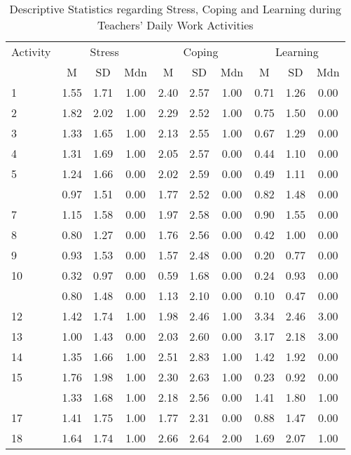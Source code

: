 \documentclass[
]{article}
\begin{document}
\begingroup\fontsize{9}{11}\selectfont

\begin{longtable}[t]{lccccccccc}
\caption{\label{tab:rq1 kable table}Descriptive Statistics regarding Stress, Coping and Learning during Teachers' Daily Work Activities}\\
\toprule
\multicolumn{1}{c}{Activity} & \multicolumn{3}{c}{Stress} & \multicolumn{3}{c}{Coping} & \multicolumn{3}{c}{Learning} \\
\cmidrule(l{3pt}r{3pt}){1-1} \cmidrule(l{3pt}r{3pt}){2-4} \cmidrule(l{3pt}r{3pt}){5-7} \cmidrule(l{3pt}r{3pt}){8-10}
 & M & SD & Mdn & M & SD & Mdn & M & SD & Mdn\\
\midrule
1 & 1.55 & 1.71 & 1.00 & 2.40 & 2.57 & 1.00 & 0.71 & 1.26 & 0.00\\
2 & 1.82 & 2.02 & 1.00 & 2.29 & 2.52 & 1.00 & 0.75 & 1.50 & 0.00\\
3 & 1.33 & 1.65 & 1.00 & 2.13 & 2.55 & 1.00 & 0.67 & 1.29 & 0.00\\
4 & 1.31 & 1.69 & 1.00 & 2.05 & 2.57 & 0.00 & 0.44 & 1.10 & 0.00\\
5 & 1.24 & 1.66 & 0.00 & 2.02 & 2.59 & 0.00 & 0.49 & 1.11 & 0.00\\
\addlinespace
6 & 0.97 & 1.51 & 0.00 & 1.77 & 2.52 & 0.00 & 0.82 & 1.48 & 0.00\\
7 & 1.15 & 1.58 & 0.00 & 1.97 & 2.58 & 0.00 & 0.90 & 1.55 & 0.00\\
8 & 0.80 & 1.27 & 0.00 & 1.76 & 2.56 & 0.00 & 0.42 & 1.00 & 0.00\\
9 & 0.93 & 1.53 & 0.00 & 1.57 & 2.48 & 0.00 & 0.20 & 0.77 & 0.00\\
10 & 0.32 & 0.97 & 0.00 & 0.59 & 1.68 & 0.00 & 0.24 & 0.93 & 0.00\\
\addlinespace
11 & 0.80 & 1.48 & 0.00 & 1.13 & 2.10 & 0.00 & 0.10 & 0.47 & 0.00\\
12 & 1.42 & 1.74 & 1.00 & 1.98 & 2.46 & 1.00 & 3.34 & 2.46 & 3.00\\
13 & 1.00 & 1.43 & 0.00 & 2.03 & 2.60 & 0.00 & 3.17 & 2.18 & 3.00\\
14 & 1.35 & 1.66 & 1.00 & 2.51 & 2.83 & 1.00 & 1.42 & 1.92 & 0.00\\
15 & 1.76 & 1.98 & 1.00 & 2.30 & 2.63 & 1.00 & 0.23 & 0.92 & 0.00\\
\addlinespace
16 & 1.33 & 1.68 & 1.00 & 2.18 & 2.56 & 0.00 & 1.41 & 1.80 & 1.00\\
17 & 1.41 & 1.75 & 1.00 & 1.77 & 2.31 & 0.00 & 0.88 & 1.47 & 0.00\\
18 & 1.64 & 1.74 & 1.00 & 2.66 & 2.64 & 2.00 & 1.69 & 2.07 & 1.00\\

\end{longtable}
\end{document}
